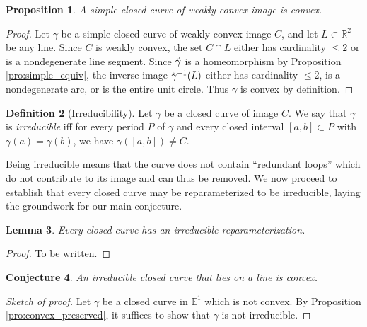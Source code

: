 \documentclass{amsart}
\newtheorem{proposition}{Proposition}[section]
\newtheorem{lemma}[proposition]{Lemma}
\newtheorem{conjecture}[proposition]{Conjecture}
\theoremstyle{definition}
\newtheorem{definition}[proposition]{Definition}
\theoremstyle{remark}
\newcommand{\lring}[1]{\accentset{\circ}{#1}}
\begin{document}
\begin{proposition}
    \label{pro:simple_convex}
    A simple closed curve of weakly convex image is convex.
\end{proposition}

\begin{proof}
    Let $\gamma$ be a simple closed curve of weakly convex image $C$,
    and let $L\subset\mathbb{R}^2$ be any line.
    Since $C$ is weakly convex, the set $C\cap L$
    either has cardinality $\le2$ or is a nondegenerate line segment.
    Since $\lring{\gamma}$ is a homeomorphism by Proposition
    \ref{pro:simple_equiv}, the inverse image $\lring{\gamma}^{-1}(L)$
    either has cardinality $\le2$, is a nondegenerate arc, or is
    the entire unit circle. Thus $\gamma$ is convex by definition.
\end{proof}

\begin{definition}[Irreducibility]
    Let $\gamma$ be a closed curve of image $C$.
    We say that $\gamma$ is \emph{irreducible} iff for every period
    $P$ of $\gamma$ and every closed interval $[a,b]\subset P$
    with $\gamma(a)=\gamma(b)$, we have
    $\gamma([a,b])\ne C$.
\end{definition}

Being irreducible means that the curve does not contain
``redundant loops'' which do not contribute to its image
and can thus be removed. We now proceed to establish
that every closed curve may be reparameterized to be
irreducible, laying the groundwork for our main conjecture.

\begin{lemma}
    \label{lem:irr_exists}
    Every closed curve has an irreducible reparameterization.
\end{lemma}

\begin{proof}
    To be written.
\end{proof}

\begin{conjecture}
    \label{con:irr_linear_convex}
    An irreducible closed curve that lies on a line is convex.
\end{conjecture}

\begin{proof}[Sketch of proof]
    Let $\gamma$ be a closed curve in $\mathbb{E}^1$ which is
    not convex. By Proposition \ref{pro:convex_preserved},
    it suffices to show that $\gamma$ is not irreducible.
\end{proof}
\end{document}

